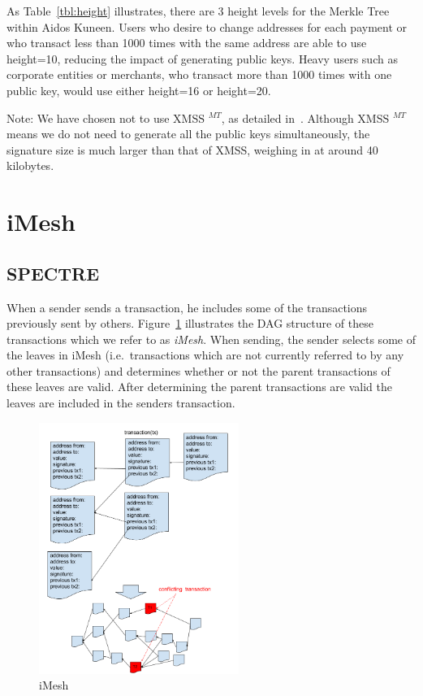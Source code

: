 \documentclass[a4paper,10pt,twocolumn]{article}
\begin{document}
	As Table~\ref{tbl:height} illustrates, there are 3 height levels for the Merkle Tree within Aidos Kuneen. Users who desire to change 
	addresses for each payment or who transact less than 1000 times with the same address are able to use height=10, reducing the impact of 
	generating public keys. Heavy users such as corporate entities or merchants, who transact more than 1000 times with one 
	public key, would use either height=16 or height=20.
	
	\vspace{2.5mm}
	
	Note: We have chosen not to use XMSS \(^{MT}\), as detailed in~\cite{ietf}. Although XMSS \(^{MT}\) means we do not need to generate all the public keys simultaneously, the signature size is much larger than that of XMSS, weighing in at around 40 kilobytes.
	
	\section{iMesh}
	\label{sec:imesh}
	
	\subsection{SPECTRE}
	When a sender sends a transaction, he includes some of the transactions previously sent by others. 
	Figure~\ref{fig:imesh} illustrates the DAG structure of these transactions which we refer to as \emph{iMesh}. When sending,
	the sender selects some of the leaves in iMesh (i.e.\ transactions which are not currently referred to by any other transactions) and 
	determines whether or not the parent transactions of these leaves are valid. After determining the parent transactions are valid the 
	leaves are included in the senders transaction.
	
	\begin{figure}[ht]
		\begin{center}
		\includegraphics[width=65mm]{dag.png}
		  \caption{iMesh}
		\label{fig:imesh}
		\end{center}
	 \end{figure}
	
\end{document}
